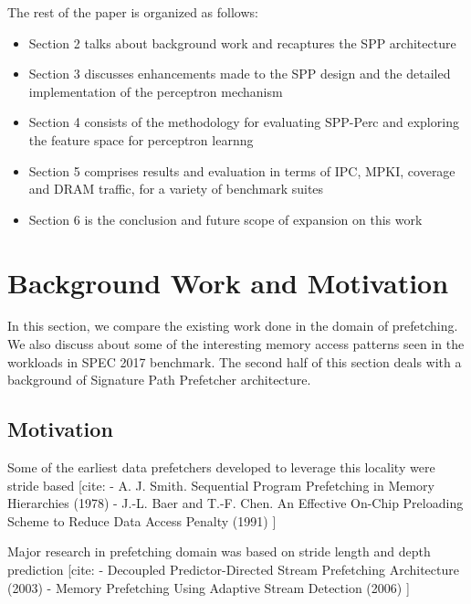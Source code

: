 \documentclass{sig-alternate}
\begin{document}
\vspace{1ex}The rest of the paper is organized as follows:

\begin{itemize}
\item Section 2 talks about background work and recaptures the SPP architecture
\item Section 3 discusses enhancements made to the SPP design and the detailed implementation of the perceptron mechanism
\item Section 4 consists of the methodology for evaluating SPP-Perc and exploring the feature space for perceptron learnng
\item Section 5 comprises results and evaluation in terms of IPC, MPKI, coverage and DRAM traffic, for a variety of benchmark suites
\item Section 6 is the conclusion and future scope of expansion on this work
\end{itemize}

\section{Background Work and Motivation}

In this section, we compare the existing work done in the domain of prefetching. 
We also discuss about some of the interesting memory access patterns seen in the workloads in SPEC 2017 benchmark. 
The second half of this section deals with a background of Signature Path Prefetcher architecture.

\subsection{Motivation}
Some of the earliest data prefetchers developed to leverage this locality were stride based [cite:\newline
- A. J. Smith. Sequential Program Prefetching in Memory Hierarchies (1978)\newline
- J.-L. Baer and T.-F. Chen. An Effective On-Chip Preloading Scheme to Reduce Data Access Penalty (1991)\newline
]\newline

Major research in prefetching domain was based on stride length and depth prediction [cite:\newline
- Decoupled Predictor-Directed Stream Prefetching
Architecture (2003)\newline
- Memory Prefetching Using Adaptive Stream Detection (2006)\newline
]\newline
\end{document}
